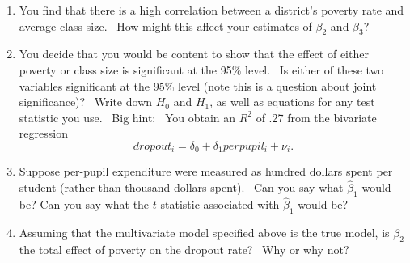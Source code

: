 \documentclass[11pt]{article}
\begin{document}
\begin{enumerate}
\begin{enumerate}
\item You find that there is a high correlation between a district's poverty
rate and average class size. \ How might this affect your estimates of $%
\beta _{2}$ and $\beta _{3}$? \ 

\item You decide that you would be content to show that the effect of either
poverty or class size is significant at the 95\% level. \ Is either of these
two variables significant at the 95\% level (note this is a question about
joint significance)? \ Write down $H_{0}$ and $H_{1}$, as well as equations
for any test statistic you use. \ Big hint: \ You obtain an $R^{2}$ of .27
from the bivariate regression%
\begin{equation*}
dropout_{i}=\delta _{0}+\delta _{1}perpupil_{i}+\nu _{i}.
\end{equation*}

\item Suppose per-pupil expenditure were measured as hundred dollars spent
per student (rather than thousand dollars spent). \ Can you say what $%
\widehat{\beta }_{1}$ would be? Can you say what the $t$-statistic
associated with $\widehat{\beta }_{1}$ would be?

\item Assuming that the multivariate model specified above is the true
model, is $\beta _{2}$ the total effect of poverty on the dropout rate? \
Why or why not?
\end{enumerate}
\end{enumerate}
\end{document}
